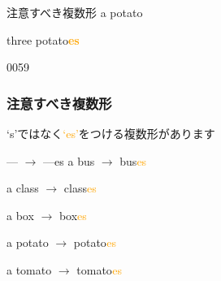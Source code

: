 \documentclass[aspectratio=169,xcolor={dvipsnames,table}]{beamer}
\newcommand{\myaudio}[1]{\href{#1}{\faVolumeUp}}
\begin{document}
\begin{frame}[plain]{注意すべき複数形}
\hspace{15pt}
\pause
{\LARGE a potato} 
\pause

\bigskip

\bigskip

\hspace{15pt}
\pause
{\LARGE three  potato\textcolor{orange}{\bfseries es}}

{\tiny 0059}\,{\scriptsize \myaudio{./audio/005_singular_plural_06.mp3}}
\end{frame}
\begin{frame}[plain]\frametitle{注意すべき複数形}

{\Large `s'ではなく\textcolor{orange}{`es'}をつける複数形があります}
\pause

\bigskip

\begin{block}{--- $\rightarrow$ ---es}
a bus \pause$\longrightarrow$ bus\textcolor{orange}{es}\pause%
\hfill{}\hspace*{250pt}\pause

a class \pause$\longrightarrow$ class\textcolor{orange}{es}\pause
\hfill{}\hspace*{250pt}\pause

a box \pause $\longrightarrow$ box\textcolor{orange}{es}\pause
\hfill{}\hspace*{250pt}\pause

a potato \pause$\longrightarrow$ potato\textcolor{orange}{es}\pause
\hfill{}\hspace*{250pt}\pause

a tomato \pause$\longrightarrow$ tomato\textcolor{orange}{es}\pause
\hfill{}\hspace*{250pt}
\end{block}
\end{frame}
\end{document}

